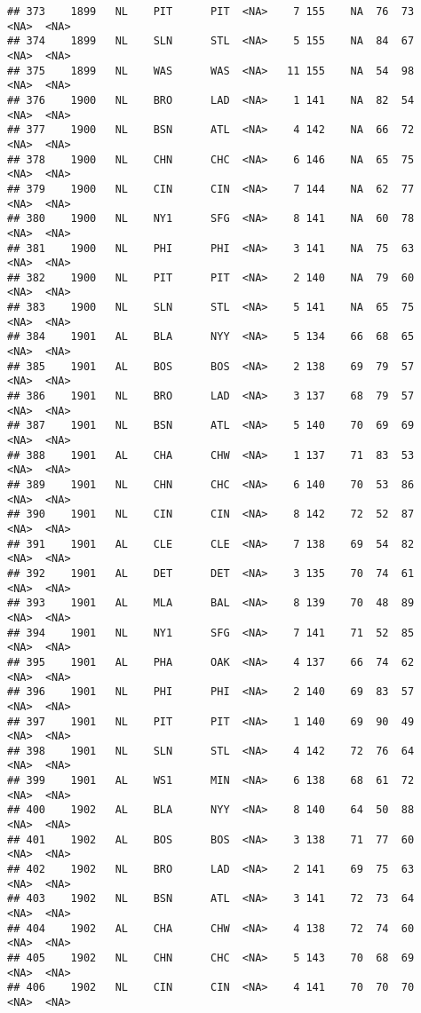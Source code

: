 \documentclass[]{article}
\begin{document}
\begin{verbatim}
## 373    1899   NL    PIT      PIT  <NA>    7 155    NA  76  73   <NA>  <NA>
## 374    1899   NL    SLN      STL  <NA>    5 155    NA  84  67   <NA>  <NA>
## 375    1899   NL    WAS      WAS  <NA>   11 155    NA  54  98   <NA>  <NA>
## 376    1900   NL    BRO      LAD  <NA>    1 141    NA  82  54   <NA>  <NA>
## 377    1900   NL    BSN      ATL  <NA>    4 142    NA  66  72   <NA>  <NA>
## 378    1900   NL    CHN      CHC  <NA>    6 146    NA  65  75   <NA>  <NA>
## 379    1900   NL    CIN      CIN  <NA>    7 144    NA  62  77   <NA>  <NA>
## 380    1900   NL    NY1      SFG  <NA>    8 141    NA  60  78   <NA>  <NA>
## 381    1900   NL    PHI      PHI  <NA>    3 141    NA  75  63   <NA>  <NA>
## 382    1900   NL    PIT      PIT  <NA>    2 140    NA  79  60   <NA>  <NA>
## 383    1900   NL    SLN      STL  <NA>    5 141    NA  65  75   <NA>  <NA>
## 384    1901   AL    BLA      NYY  <NA>    5 134    66  68  65   <NA>  <NA>
## 385    1901   AL    BOS      BOS  <NA>    2 138    69  79  57   <NA>  <NA>
## 386    1901   NL    BRO      LAD  <NA>    3 137    68  79  57   <NA>  <NA>
## 387    1901   NL    BSN      ATL  <NA>    5 140    70  69  69   <NA>  <NA>
## 388    1901   AL    CHA      CHW  <NA>    1 137    71  83  53   <NA>  <NA>
## 389    1901   NL    CHN      CHC  <NA>    6 140    70  53  86   <NA>  <NA>
## 390    1901   NL    CIN      CIN  <NA>    8 142    72  52  87   <NA>  <NA>
## 391    1901   AL    CLE      CLE  <NA>    7 138    69  54  82   <NA>  <NA>
## 392    1901   AL    DET      DET  <NA>    3 135    70  74  61   <NA>  <NA>
## 393    1901   AL    MLA      BAL  <NA>    8 139    70  48  89   <NA>  <NA>
## 394    1901   NL    NY1      SFG  <NA>    7 141    71  52  85   <NA>  <NA>
## 395    1901   AL    PHA      OAK  <NA>    4 137    66  74  62   <NA>  <NA>
## 396    1901   NL    PHI      PHI  <NA>    2 140    69  83  57   <NA>  <NA>
## 397    1901   NL    PIT      PIT  <NA>    1 140    69  90  49   <NA>  <NA>
## 398    1901   NL    SLN      STL  <NA>    4 142    72  76  64   <NA>  <NA>
## 399    1901   AL    WS1      MIN  <NA>    6 138    68  61  72   <NA>  <NA>
## 400    1902   AL    BLA      NYY  <NA>    8 140    64  50  88   <NA>  <NA>
## 401    1902   AL    BOS      BOS  <NA>    3 138    71  77  60   <NA>  <NA>
## 402    1902   NL    BRO      LAD  <NA>    2 141    69  75  63   <NA>  <NA>
## 403    1902   NL    BSN      ATL  <NA>    3 141    72  73  64   <NA>  <NA>
## 404    1902   AL    CHA      CHW  <NA>    4 138    72  74  60   <NA>  <NA>
## 405    1902   NL    CHN      CHC  <NA>    5 143    70  68  69   <NA>  <NA>
## 406    1902   NL    CIN      CIN  <NA>    4 141    70  70  70   <NA>  <NA>

\end{verbatim}
\end{document}
